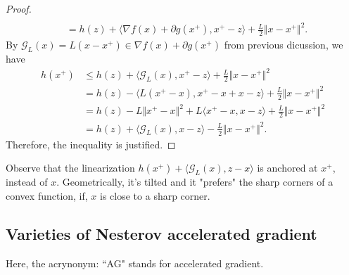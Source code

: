 \documentclass[12pt]{article}
\begin{document}
\begin{proof}
{\begin{align*}
                \\
                &= h(z) + \langle \nabla f(x) + \partial g(x^+), x^+ - z\rangle 
                + \frac{L}{2}\Vert x - x^+\Vert^2. 
            \end{align*}
            }
            By $\mathcal G_L(x) = L(x - x^+) \in \nabla f(x) + \partial g(x^+)$ from previous dicussion, we have 
            \begin{align*}
                h(x^+) &\le 
                h(z) + \langle \mathcal G_L(x), x^+ - z\rangle + \frac{L}{2}\Vert x - x^+\Vert^2
                \\
                &= h(z) - \langle L(x^+ - x), x^+ - x + x - z \rangle 
                + 
                \frac{L}{2}\Vert x - x^+\Vert^2
                \\
                &= 
                h(z) - L\Vert x^+ - x\Vert^2 
                + L \langle x^+ - x, x - z\rangle
                + \frac{L}{2}\Vert x - x^+\Vert^2
                \\
                &= h(z) + \langle \mathcal G_L(x), x - z\rangle - 
                \frac{L}{2}\Vert x - x^+\Vert^2. 
            \end{align*}
            Therefore, the inequality is justified. 
        \end{proof}
        \begin{remark}
            Observe that the linearization $h(x^+) + \langle \mathcal G_L(x), z - x\rangle$ is anchored at $x^+$, instead of $x$. 
            Geometrically, it's tilted and it "prefers" the sharp corners of a convex function, if, $x$ is close to a sharp corner. 
        \end{remark}

    \subsection{Varieties of Nesterov accelerated gradient}\label{sec:AG_varieties}
        Here, the acrynonym: ``AG" stands for accelerated gradient. 
\end{document}
